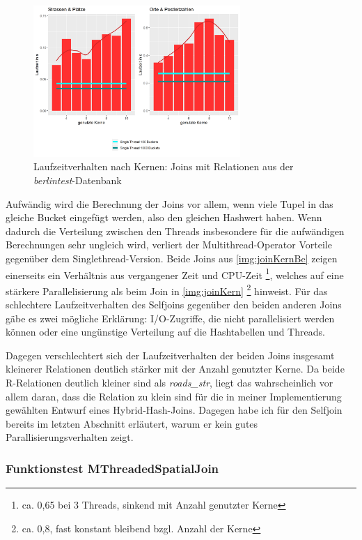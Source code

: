 \documentclass[a4paper,12pt,twoside]{article}
\newcommand{\Fb}[1]{\textit{#1}} %
\begin{document}
\begin{figure}
	\centering
	\includegraphics[width=0.7\textwidth]{Bilder/join_kerne_be.png}
	\caption{Laufzeitverhalten nach Kernen: Joins mit Relationen aus der \Fb{berlintest}-Datenbank}
	\label{img:joinKernBe}
\end{figure}

Aufwändig wird die Berechnung der Joins vor allem, wenn viele Tupel in das gleiche Bucket eingefügt werden, also den gleichen Hashwert haben. Wenn dadurch die Verteilung zwischen den Threads insbesondere für die aufwändigen Berechnungen sehr ungleich wird, verliert der Multithread-Operator Vorteile gegenüber dem Singlethread-Version. Beide Joins aus \autoref{img:joinKernBe} zeigen einerseits ein Verhältnis aus vergangener Zeit und CPU-Zeit \footnote{ca. 0,65 bei 3 Threads, sinkend mit Anzahl genutzter Kerne}, welches auf eine stärkere Parallelisierung als beim Join in \autoref{img:joinKern} \footnote{ca. 0,8, fast konstant bleibend bzgl. Anzahl der Kerne} hinweist. Für das schlechtere Laufzeitverhalten des Selfjoins gegenüber den beiden anderen Joins gäbe es zwei mögliche Erklärung: I/O-Zugriffe, die nicht parallelisiert werden können oder eine ungünstige Verteilung auf die Hashtabellen und Threads.

Dagegen verschlechtert sich der Laufzeitverhalten der beiden Joins insgesamt kleinerer Relationen deutlich stärker mit der Anzahl genutzter Kerne. Da beide R-Relationen deutlich kleiner sind als \Fb{roads\_str}, liegt das wahrscheinlich vor allem daran, dass die Relation zu klein sind für die in meiner Implementierung gewählten Entwurf eines Hybrid-Hash-Joins. Dagegen habe ich für den Selfjoin bereits im letzten Abschnitt erläutert, warum er kein gutes Parallisierungsverhalten zeigt. 

\subsubsection{Funktionstest MThreadedSpatialJoin}
\end{document}
